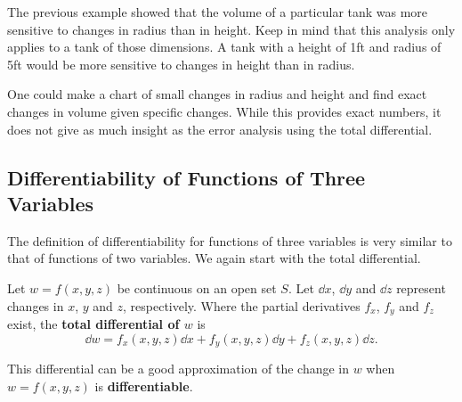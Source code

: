The previous example showed that the volume of a particular tank was more sensitive to changes in radius than in height. Keep in mind that this analysis only applies to a tank of those dimensions. A tank with a height of 1ft and radius of 5ft would be more sensitive to changes in height than in radius.

One could make a chart of small changes in radius and height and find exact changes in volume given specific changes. While this provides exact numbers, it does not give as much insight as the error analysis using the total differential.

\subsection{Differentiability of Functions of Three Variables}

The definition of differentiability for functions of three variables is very similar to that of functions of two variables. We again start with the total differential.

\begin{definition}\label{def:total_differential3}
Let $w=f(x,y,z)$ be continuous on an open set $S$. Let $\dd x$, $\dd y$ and $\dd z$ represent changes in $x$, $y$ and  $z$, respectively. Where the partial derivatives $f_x$, $f_y$ and $f_z$ exist, the \textbf{total differential of $w$} is
\[\dd w = f_x(x,y,z)\dd x + f_y(x,y,z)\dd y+f_z(x,y,z)\dd z.\]
\end{definition}

This differential can be a good approximation of the change in $w$ when $w = f(x,y,z)$ is \textbf{differentiable}.

